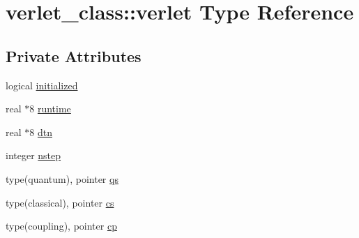 \hypertarget{structverlet__class_1_1verlet}{\section{verlet\+\_\+class\+:\+:verlet Type Reference}
\label{structverlet__class_1_1verlet}
}
\subsection*{Private Attributes}
\begin{DoxyCompactItemize}
\item 
logical \hyperlink{structverlet__class_1_1verlet_aa839aa53f8a8d077a9e4b99937e00607}{initialized}
\item 
real $\ast$8 \hyperlink{structverlet__class_1_1verlet_afe305322d2ee3c661d4ce529dae821b5}{runtime}
\item 
real $\ast$8 \hyperlink{structverlet__class_1_1verlet_aef82a1c053fd56adcd35093e4165f00b}{dtn}
\item 
integer \hyperlink{structverlet__class_1_1verlet_a94ed501ab7103c03df9e37c9919bbc64}{nstep}
\item 
type(quantum), pointer \hyperlink{structverlet__class_1_1verlet_ab214513948e288a736b804304296c43e}{qs}
\item 
type(classical), pointer \hyperlink{structverlet__class_1_1verlet_a0f97f83e8828f3cdcf4c10c87aa75ff2}{cs}
\item 
type(coupling), pointer \hyperlink{structverlet__class_1_1verlet_a0537521e0e2f9c0cbdafc13f3099213c}{cp}
\end{DoxyCompactItemize}


